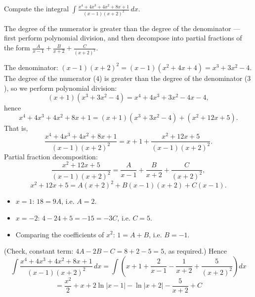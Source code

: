 
\begin{question}
Compute the integral $\displaystyle\int\frac{x^4+4x^3+4x^2+8x+1}{(x-1)(x+2)^2}\,dx$.
\end{question}

\begin{hint}
The degree of the numerator is greater than the degree of the denominator — first perform polynomial division, and then decompose into partial fractions of the form $\frac{A}{x-1}+\frac{B}{x+2}+\frac{C}{(x+2)^2}$.
\end{hint}

\begin{solution}
The denominator: $(x-1)(x+2)^2=(x-1)(x^2+4x+4)=x^3+3x^2-4$. The degree of the numerator ($4$) is greater than the degree of the denominator ($3$), so we perform polynomial division:
\[ (x+1)(x^3+3x^2-4)=x^4+4x^3+3x^2-4x-4, \]
hence
\[ x^4+4x^3+4x^2+8x+1=(x+1)(x^3+3x^2-4)+(x^2+12x+5). \]
That is,
\[ \frac{x^4+4x^3+4x^2+8x+1}{(x-1)(x+2)^2}=x+1+\frac{x^2+12x+5}{(x-1)(x+2)^2}. \]
Partial fraction decomposition:
\[ \frac{x^2+12x+5}{(x-1)(x+2)^2}=\frac{A}{x-1}+\frac{B}{x+2}+\frac{C}{(x+2)^2}, \]
\[ x^2+12x+5=A(x+2)^2+B(x-1)(x+2)+C(x-1). \]
\begin{itemize}
  \item $x=1$: $18=9A$, i.e. $A=2$.
  \item $x=-2$: $4-24+5=-15=-3C$, i.e. $C=5$.
  \item Comparing the coefficients of $x^2$: $1=A+B$, i.e. $B=-1$.
\end{itemize}
(Check, constant term: $4A-2B-C=8+2-5=5$, as required.) Hence
\[ \int\frac{x^4+4x^3+4x^2+8x+1}{(x-1)(x+2)^2}\,dx=\int\left(x+1+\frac{2}{x-1}-\frac{1}{x+2}+\frac{5}{(x+2)^2}\right)dx \]
\[ \boxed{=\frac{x^2}{2}+x+2\ln|x-1|-\ln|x+2|-\frac{5}{x+2}+C} \]
\end{solution}
